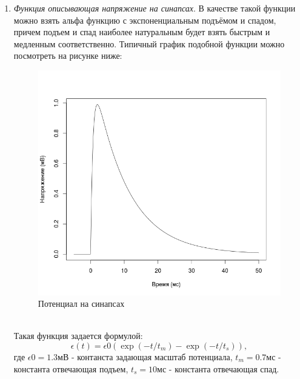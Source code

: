 \documentclass[a4paper,10pt]{article}
\begin{document}
\begin{enumerate}
\item \textit{Функция описывающая напряжение на синапсах}. В качестве такой функции можно взять альфа функцию с экспоненциальным подъёмом и спадом, причем подъем и спад наиболее натуральным будет взять быстрым и медленным соответственно. Типичный график подобной функции можно посмотреть на рисунке ниже:
\begin{figure}[ht]
\centering
\includegraphics[width=0.75\linewidth]{epsp}
\caption{Потенциал на синапсах}
\end{figure} \\
Такая функция задается формулой:
\begin{equation}\label{eq:epsp}
\epsilon(t) =	\epsilon{0}(\exp(-t/t_{m})-\exp(-t/t_{s})),
\end{equation}
где $\epsilon{0} = 1.3$мВ - контанста задающая масштаб потенциала, $t_{m}=0.7$мс - константа отвечающая подъем, $t_{s} = 10$мс - константа отвечающая спад.


\end{enumerate}
\end{document}
